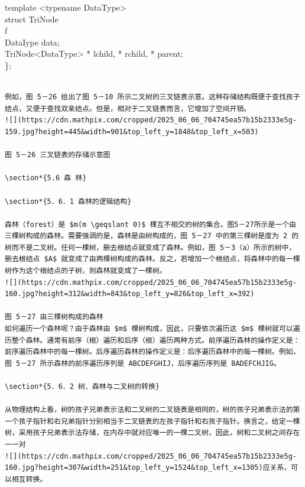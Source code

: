 \documentclass[10pt]{article}
\begin{document}
template <typename DataType>\\
struct TriNode\\
f\\
DataIype data;\\
TriNode<DataType> * lchild, * rchild, * parent;\\
\};

\begin{verbatim}

例如，图 5－26 给出了图 5－10 所示二叉树的三叉链表示意。这种存储结构既便于查找孩子结点，又便于查找双亲结点。但是，相对于二叉链表而言，它增加了空间开销。
![](https://cdn.mathpix.com/cropped/2025_06_06_704745ea57b15b2333e5g-159.jpg?height=445&width=901&top_left_y=1848&top_left_x=503)

图 5－26 三叉链表的存储示意图

\section*{5.6 森 林}

\section*{5．6．1 森林的逻辑结构}

森林（forest）是 $m(m \geqslant 0)$ 棵互不相交的树的集合。图5－27所示是一个由三棵树构成的森林。需要强调的是，森林是由树构成的，图 5－27 中的第三棵树是度为 2 的树而不是二叉树。任何一棵树，删去根结点就变成了森林。例如，图 5－3（a）所示的树中，删去根结点 $A$ 就变成了由两棵树构成的森林。反之，若增加一个根结点，将森林中的每一棵树作为这个根结点的子树，则森林就变成了一棵树。
![](https://cdn.mathpix.com/cropped/2025_06_06_704745ea57b15b2333e5g-160.jpg?height=312&width=843&top_left_y=826&top_left_x=392)

图 5－27 由三棵树构成的森林
如何遍历一个森林呢？由于森林由 $m$ 棵树构成，因此，只要依次遍历这 $m$ 棵树就可以遍历整个森林。通常有前序（根）遍历和后序（根）遍历两种方式。前序遍历森林的操作定义是：前序遍历森林中的每一棵树。后序遍历森林的操作定义是：后序遍历森林中的每一棵树。例如，图 5－27 所示森林的前序遍历序列是 ABCDEFGHIJ，后序遍历序列是 BADEFCHJIG。

\section*{5．6．2 树、森林与二叉树的转换}

从物理结构上看，树的孩子兄弟表示法和二叉树的二叉链表是相同的，树的孩子兄弟表示法的第一个孩子指针和右兄弟指针分别相当于二叉链表的左孩子指针和右孩子指针。换言之，给定一棵树，采用孩子兄弟表示法存储，在内存中就对应唯一的一棵二叉树，因此，树和二叉树之间存在一一对
![](https://cdn.mathpix.com/cropped/2025_06_06_704745ea57b15b2333e5g-160.jpg?height=307&width=251&top_left_y=1524&top_left_x=1305)应关系，可以相互转换。


\end{verbatim}
\end{document}
